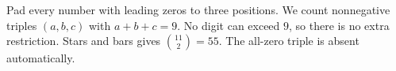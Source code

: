Pad every number with leading zeros to three positions. We count nonnegative triples $(a,b,c)$ with $a+b+c=9$. No digit can exceed $9$, so there is no extra restriction. Stars and bars gives $\binom{11}{2}=\boxed{55}$. The all-zero triple is absent automatically.
